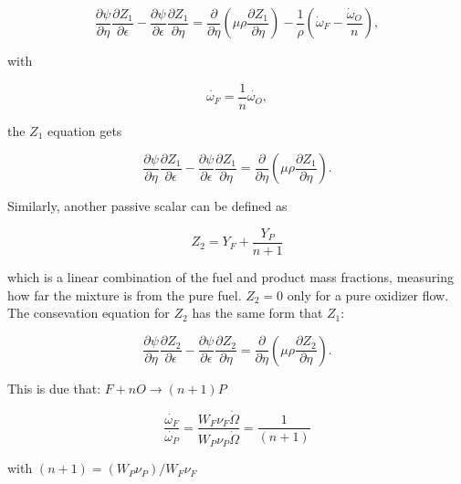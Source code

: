 \begin{equation} 
\frac{\partial \psi}{\partial \eta}
\frac{\partial Z_1}{\partial \epsilon}
-
\frac{\partial \psi}{\partial \epsilon}
\frac{\partial Z_1}{\partial \eta}
=
\frac{\partial}{\partial \eta}
\left(\mu\rho \frac{\partial Z_1}{\partial \eta}\right)
-
\frac{1}{\rho}
\left(
    \dot{\omega}_F
    -
    \frac{\dot{\omega}_O}{n}
\right)
,
\end{equation} 

with 

\begin{equation}
    \dot{\omega_F}=\frac{1}{n}{\dot{\omega_O}}
    ,
\end{equation}

the $Z_1$ equation gets 

\begin{equation} 
\frac{\partial \psi}{\partial \eta}
\frac{\partial Z_1}{\partial \epsilon}
-
\frac{\partial \psi}{\partial \epsilon}
\frac{\partial Z_1}{\partial \eta}
=
\frac{\partial}{\partial \eta}
\left(
    \mu\rho  \frac{\partial Z_1}{\partial \eta}
\right)
.
\end{equation} 

Similarly, another passive scalar can be defined as

\begin{equation}
Z_2=
Y_F
+
\frac{Y_P}{n+1}
\end{equation}          

which is a linear combination of the fuel and product mass fractions,
measuring how far the mixture is from the pure fuel. 
$Z_2=0$ only for a pure oxidizer flow. 
The consevation equation for $Z_2$ has the same form that $Z_1$:  

\begin{equation} 
\frac{\partial \psi}{\partial \eta}
\frac{\partial Z_2}{\partial \epsilon}
-
\frac{\partial \psi}{\partial \epsilon}
\frac{\partial Z_2}{\partial \eta}
=
\frac{\partial}{\partial \eta}
\left(
     \mu\rho  \frac{\partial Z_2}{\partial \eta}
\right)
.
\end{equation} 

This is due that: $F+n O \rightarrow (n+1)P$

\begin{equation}
    \frac{\dot{\omega_F}}{\dot{\omega_P}}
    =
    \frac{W_F\nu_F\dot{\Omega}}{W_P\nu_P\dot{\Omega}}
    =
    \frac{1}{(n+1)}
\end{equation}

with $(n+1)=(W_P\nu_P)/W_F\nu_F$ 

